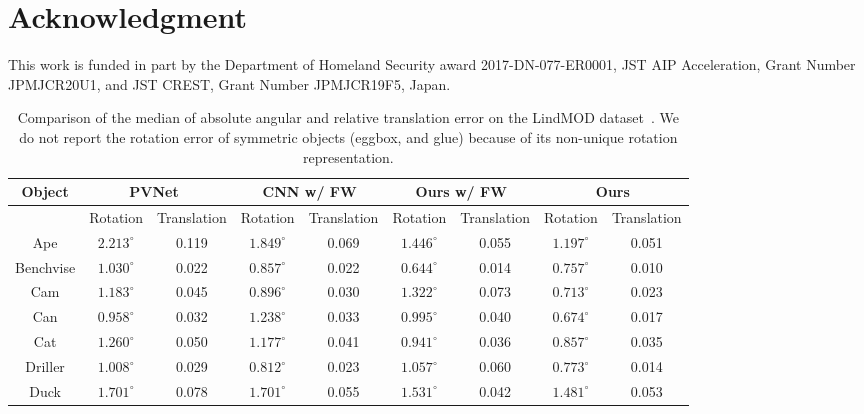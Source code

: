 \documentclass[10pt,twocolumn,letterpaper]{article}
\begin{document}
\section{Acknowledgment}
This work is funded in part by the Department of Homeland Security award 2017-DN-077-ER0001, JST AIP Acceleration, Grant Number JPMJCR20U1, and JST CREST, Grant Number JPMJCR19F5, Japan.




\clearpage

\appendix

\begin{table*}
\caption{Comparison of the median of absolute angular and relative translation error on the LindMOD dataset~\cite{linemod}. We do not report the rotation error of symmetric objects (eggbox, and glue) because of its non-unique rotation representation.}
\centering
\vspace*{1mm}
\begin{tabular}{c||cc|cc|cc|cc}
  \hline
  {Object}
             & \multicolumn{2}{c|}{PVNet~\cite{peng2019pvnet}} &
               \multicolumn{2}{c|}{CNN w/ FW} &
               \multicolumn{2}{c|}{Ours w/ FW} &
               \multicolumn{2}{c}{Ours} \\ \hline
  & Rotation & Translation & Rotation & Translation & Rotation & Translation & Rotation & Translation\\ \hline
  Ape        & $2.213^{\circ} $ & 0.119 & $1.849^{\circ}$ & 0.069 & $1.446^{\circ}$ & 0.055 & $1.197^{\circ}$ & 0.051 \\
  Benchvise  & $1.030^{\circ} $ & 0.022 & $0.857^{\circ}$ & 0.022 & $0.644^{\circ}$ & 0.014 & $0.757^{\circ}$ & 0.010 \\
  Cam        & $1.183^{\circ} $ & 0.045 & $0.896^{\circ}$ & 0.030 & $1.322^{\circ}$ & 0.073 & $0.713^{\circ}$ & 0.023 \\
  Can        & $0.958^{\circ} $ & 0.032 & $1.238^{\circ}$ & 0.033 & $0.995^{\circ}$ & 0.040 & $0.674^{\circ}$ & 0.017 \\
  Cat        & $1.260^{\circ} $ & 0.050 & $1.177^{\circ}$ & 0.041 & $0.941^{\circ}$ & 0.036 & $0.857^{\circ}$ & 0.035 \\
  Driller    & $1.008^{\circ} $ & 0.029 & $0.812^{\circ}$ & 0.023 & $1.057^{\circ}$ & 0.060 & $0.773^{\circ}$ & 0.014 \\
  Duck       & $1.701^{\circ} $ & 0.078 & $1.701^{\circ}$ & 0.055 & $1.531^{\circ}$ & 0.042 & $1.481^{\circ}$ & 0.053 \\

\end{tabular}
\end{table*}
\end{document}
